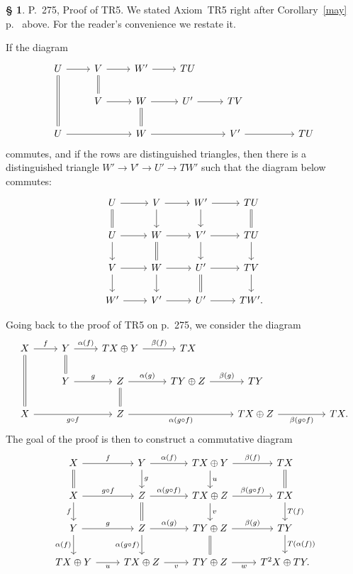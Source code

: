 \documentclass[12pt]{article}%
\theoremstyle{remark}
\theoremstyle{definition}
\newtheorem{s}[thm]{\S}%
\begin{document}
\begin{s}
P.~275, Proof of TR5. We stated Axiom~TR5 right after Corollary~\ref{may} p.~\pageref{may} above. For the reader's convenience we restate it. 

If the diagram 
$$
\begin{tikzcd}
U\ar[equal]{dd}\ar{r}&V\ar[equal]{d}\ar{r}&W'\ar{r}&TU\\
&V\ar{r}&W\ar[equal]{d}\ar{r}&U'\ar{r}&TV\\
U\ar{rr}&&W\ar{rr}&&V'\ar{rr}&&TU
\end{tikzcd}
$$
commutes, and if the rows are distinguished triangles, then there is a distinguished triangle $W'\to V'\to U'\to TW'$ such that the diagram below commutes:
$$
\begin{tikzcd}
U\ar{r}\ar[equal]{d}&V\ar{d}\ar{r}&W'\ar{d}\ar{r}&TU\ar[equal]{d}\\
U\ar{d}\ar{r}&W\ar{r}\ar[equal]{d}&V'\ar{d}\ar{r}&TU\ar{d}\\
V\ar{d}\ar{r}&W\ar{d}\ar{r}&U'\ar{r}\ar[equal]{d}&TV\ar{d}\\
W'\ar{r}&V'\ar{r}&U'\ar{r}&TW'.
\end{tikzcd}
$$ 

Going back to the proof of TR5 on p.~275, we consider the diagram
$$
\begin{tikzcd}
X\ar[equal]{dd}\ar{r}{f}&Y\ar[equal]{d}\ar{r}{\alpha(f)}&TX\oplus Y\ar{r}{\beta(f)}&TX\\
&Y\ar{r}{g}&Z\ar[equal]{d}\ar{r}{\alpha(g)}&TY\oplus Z\ar{r}{\beta(g)}&TY\\
X\ar[swap]{rr}{g\circ f}&&Z\ar[swap]{rr}{\alpha(g\circ f)}&&TX\oplus Z\ar[swap]{rr}{\beta(g\circ f)}&&TX.
\end{tikzcd}
$$ 
The goal of the proof is then to construct a commutative diagram
$$
\begin{tikzcd}
X\ar{r}{f}\ar[equal]{d}&Y\ar{r}{\alpha(f)}\ar{d}{g}&TX\oplus Y\ar{r}{\beta(f)}\ar{d}{u}&TX\ar[equal]{d}\\ 
X\ar{r}{g\circ f}\ar{d}[swap]{f}&Z\ar{r}{\alpha(g\circ f)}\ar[equal]{d}&TX\oplus Z\ar{r}{\beta(g\circ f)}\ar{d}{v}&TX\ar{d}{T(f)}\\ 
Y\ar{r}{g}\ar{d}[swap]{\alpha(f)}&Z\ar{r}{\alpha(g)}\ar{d}[swap]{\alpha(g\circ f)}&TY\oplus Z\ar{r}{\beta(g)}\ar[equal]{d}&TY\ar{d}{T(\alpha(f))}\\ 
TX\oplus Y\ar{r}[swap]{u}&TX\oplus Z\ar{r}[swap]{v}&TY\oplus Z\ar{r}[swap]{w}&T^2X\oplus TY.
\end{tikzcd}
$$ 
\end{s}
\end{document}
